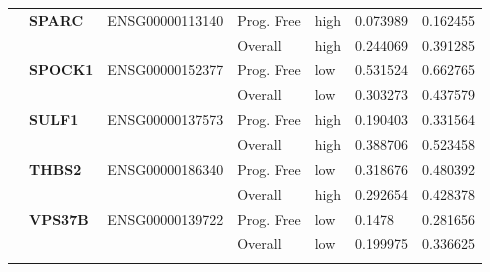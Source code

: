 \begin{spacing}{1}
{\begin{longtable}{%
            |>{\bfseries}p{2cm}|
            >{\bfseries}p{1.9cm}|
            >{\tiny}p{1.9cm}|
            p{2cm}|
            p{2cm}|
            p{1.5cm}|
            p{1.5cm}|
            }
             & SPARC    & ENSG00000113140 & Prog. Free & high & 0.073989 & 0.162455 \\
            \hhline{~~~----}
             &          &                 & Overall    & high & 0.244069 & 0.391285 \\
            \hhline{~======}
             & SPOCK1   & ENSG00000152377 & Prog. Free & low  & 0.531524 & 0.662765 \\
            \hhline{~~~----}
             &          &                 & Overall    & low  & 0.303273 & 0.437579 \\
            \hhline{~======}
             & SULF1    & ENSG00000137573 & Prog. Free & high & 0.190403 & 0.331564 \\
            \hhline{~~~----}
             &          &                 & Overall    & high & 0.388706 & 0.523458 \\
            \hhline{~======}
             & THBS2    & ENSG00000186340 & Prog. Free & low  & 0.318676 & 0.480392 \\
            \hhline{~~~----}
             &          &                 & Overall    & high & 0.292654 & 0.428378 \\
            \hhline{~======}
             & VPS37B   & ENSG00000139722 & Prog. Free & low  & 0.1478   & 0.281656 \\
            \hhline{~~~----}
             &          &                 & Overall    & low  & 0.199975 & 0.336625 \\
            \hhline{~======}
            \hline



\end{longtable}}
\end{spacing}
